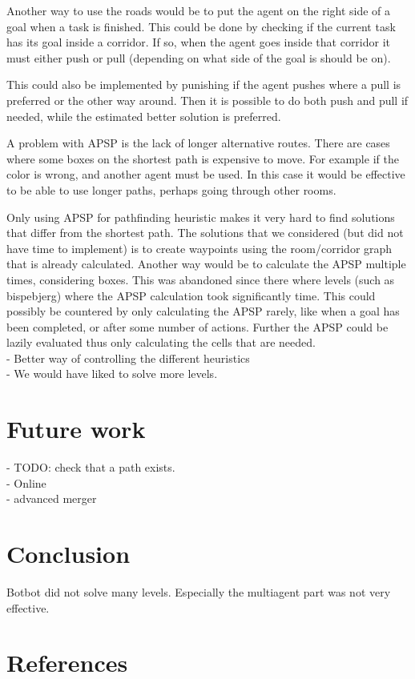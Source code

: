 \documentclass[letterpaper]{article}
\begin{document}
Another way to use the roads would be to put the agent on the right side of
a goal when a task is finished. This could be done by checking if the current task
has its goal inside a corridor. If so, when the agent goes inside that corridor
it must either push or pull (depending on what side of the goal is should be on).

This could also be implemented by punishing if the agent pushes where a pull is
preferred or the other way around. Then it is possible to do both push and pull
if needed, while the estimated better solution is preferred.

A problem with APSP is the lack of longer alternative routes. There are cases
where some boxes on the shortest path is expensive to move. For example if
the color is wrong, and another agent must be used. In this case it would be
effective to be able to use longer paths, perhaps going through other rooms.

Only using APSP for pathfinding heuristic makes it very hard to find solutions
that differ from the shortest path. The solutions that we considered (but did not
have time to implement) is to create waypoints using the room/corridor graph
that is already calculated. Another way would be to calculate the APSP multiple
times, considering boxes. This was abandoned since there where levels (such as bispebjerg)
where the APSP calculation took significantly time. This could possibly be countered
by only calculating the APSP rarely, like when a goal has been completed, or
after some number of actions. Further the APSP could be lazily evaluated thus
only calculating the cells that are needed.\\

- Better way of controlling the different heuristics\\
- We would have liked to solve more levels.\\

\section{Future work}
- TODO: check that a path exists.\\
- Online\\
- advanced merger\\
\section{Conclusion}
Botbot did not solve many levels. Especially the multiagent part was not
very effective.


\section{References}


\end{document}
